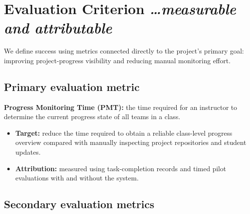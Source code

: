 \documentclass[11pt,a4paper]{article}
\newcommand{\BvrHint}[1]{%
  \texorpdfstring{%
    {\normalfont\normalsize\itshape\hfill #1}%
  }{}%
}
\begin{document}
\section{Evaluation Criterion%
  \BvrHint{\ldots measurable and attributable}}

We define success using metrics connected directly to the project's primary goal: improving project-progress visibility and reducing manual monitoring effort.


\subsection{Primary evaluation metric}

\textbf{Progress Monitoring Time (PMT):} the time required for an instructor to determine the current progress state of all teams in a class.

\begin{itemize}[leftmargin=0.7cm]

    \item \textbf{Target:} reduce the time required to obtain a reliable class-level progress overview compared with manually inspecting project repositories and student updates.

    \item \textbf{Attribution:} measured using task-completion records and timed pilot evaluations with and without the system.

\end{itemize}


\subsection{Secondary evaluation metrics}
\end{document}
